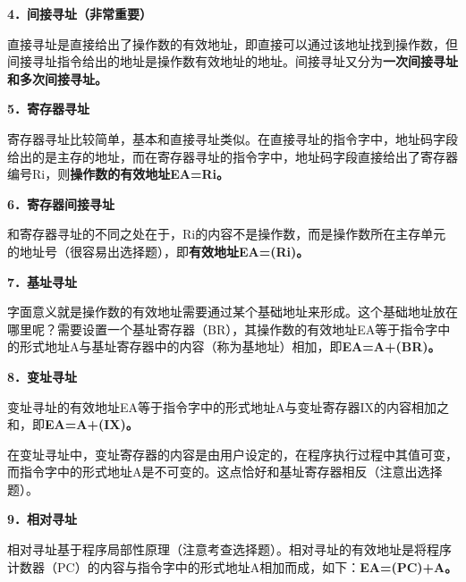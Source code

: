 {\textbf{4．间接寻址（非常重要）}}

直接寻址是直接给出了操作数的有效地址，即直接可以通过该地址找到操作数，但间接寻址指令给出的地址是操作数有效地址的地址。{间接寻址又分为}\textbf{一次间接寻址和多次间接寻址。}

{\textbf{5．寄存器寻址}}

寄存器寻址比较简单，基本和直接寻址类似。在直接寻址的指令字中，地址码字段给出的是主存的地址，而在寄存器寻址的指令字中，地址码字段直接给出了寄存器编号Ri，则\textbf{操作数的有效地址EA=Ri。}

{\textbf{6．寄存器间接寻址}}

和寄存器寻址的不同之处在于，Ri的内容不是操作数，而是操作数所在主存单元的地址号（很容易出选择题），即\textbf{有效地址EA=(Ri)。}

{\textbf{7．基址寻址}}

字面意义就是操作数的有效地址需要通过某个基础地址来形成。这个基础地址放在哪里呢？需要设置一个基址寄存器（BR），其操作数的有效地址EA等于指令字中的形式地址A与基址寄存器中的内容（称为基地址）相加，即\textbf{EA=A+(BR)。}

{\textbf{8．变址寻址}}

变址寻址的有效地址EA等于指令字中的形式地址A与变址寄存器IX的内容相加之和，即\textbf{EA=A+(IX)。}

{}{在变址寻址中，变址寄存器的内容是由用户设定的，在程序执行过程中其值可变，而指令字中的形式地址A是不可变的。这点恰好和基址寄存器相反（注意出选择题）。}{}

{{\textbf{9．相对寻址}}}

{{相对寻址基于程序局部性原理（注意考查选择题）。相对寻址的有效地址是将程序计数器（PC）的内容与指令字中的形式地址A相加而成，如下：}{\textbf{EA=(PC)+A。}}\\
}
